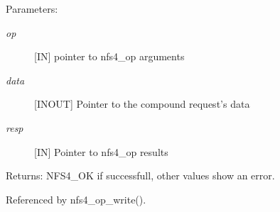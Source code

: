 \begin{Desc}
\item[Parameters:]
\begin{description}
\item[{\em op}][IN] pointer to nfs4\_\-op arguments \item[{\em data}][INOUT] Pointer to the compound request's data \item[{\em resp}][IN] Pointer to nfs4\_\-op results\end{description}
\end{Desc}
\begin{Desc}
\item[Returns:]NFS4\_\-OK if successfull, other values show an error. \end{Desc}


Referenced by nfs4\_\-op\_\-write().